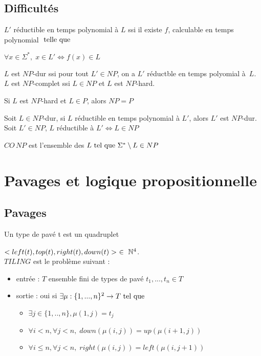 \documentclass[10pt,a4paper]{article}
\begin{document}
 \subsection{Difficultés}
 \begin{definition}{}$L'$ réductible en temps polynomial à $L$ ssi il existe $f$, calculable en temps polynomial $\tq[le]$

$\forall x \in \Sigma ^*, \; x \in L' \Leftrightarrow f(x) \in L$
 \end{definition}
 \begin{definition}{}$L$ est $NP$-dur ssi pour tout $L' \in NP$, on a $L'$ réductble en temps polyomial à~$L$.\\
 $L$ est $NP$-complet ssi $L \in NP$ et $L$ est $NP$-hard.
 \end{definition}
\begin{rem} 
Si $L$ est $NP$-hard et  $L \in P$, alors $NP = P$
\end{rem}
 
\begin{prop}
 Soit $L \in NP$-dur, si $L$ réductible en temps polynomial à $L'$, alors $L'$ est $NP$-dur.\\
Soit $L' \in NP$, $L$ réductible à $L' \Leftrightarrow L \in NP$
\end{prop}
 
 \begin{definition}$CO\,NP$ est l'ensemble des $L \tq \Sigma^* \setminus L \in NP$
 \end{definition}
 \section{Pavages et logique propositionnelle}
 
 \subsection{Pavages} 
\begin{definition}
Un type de pavé t est un quadruplet 

$< left(t), top(t), right(t), down(t) >~ \in~ \Ns^4$.\\
 $TILING$ est le problème suivant : \begin{itemize}
 \item entrée : $T$ ensemble fini de types de pavé $t_1, ..., t_n \in T$
\item sortie : oui si $\exists \mu : \{ 1, ..., n\} ^2 \rightarrow T \tq$ 
\begin{itemize}
\item $\exists j \in \{1, .., n\}, \mu(1,j) = t_j$
\item $\forall i < n, \forall j < n, \; down(\mu(i,j)) = up(\mu(i+1, j))$
\item $\forall i \leq n , \forall j < n, \; right (\mu (i,j)) = left( \mu (i, j+1))$
\end{itemize}
\end{itemize}
\end{definition}
\end{document}
